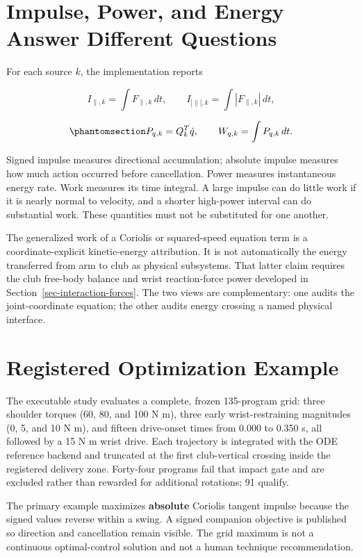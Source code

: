 \documentclass[
  letterpaper,
]{report}
\begin{document}
\section{Impulse, Power, and Energy Answer Different
Questions}\label{sec-source-metrics}

For each source \(k\), the implementation reports

\[
I_{\parallel,k}=\int F_{\parallel,k}\,dt,
\qquad
I_{|\parallel|,k}=\int |F_{\parallel,k}|\,dt,
\]

\begin{equation}\phantomsection\label{eq-source-integrals}{
P_{q,k}=Q_k^T\dot q,
\qquad
W_{q,k}=\int P_{q,k}\,dt.
}\end{equation}

Signed impulse measures directional accumulation; absolute impulse
measures how much action occurred before cancellation. Power measures
instantaneous energy rate. Work measures its time integral. A large
impulse can do little work if it is nearly normal to velocity, and a
shorter high-power interval can do substantial work. These quantities
must not be substituted for one another.

The generalized work of a Coriolis or squared-speed equation term is a
coordinate-explicit kinetic-energy attribution. It is not automatically
the energy transferred from arm to club as physical subsystems. That
latter claim requires the club free-body balance and wrist
reaction-force power developed in Section~\ref{sec-interaction-forces}.
The two views are complementary: one audits the joint-coordinate
equation; the other audits energy crossing a named physical interface.

\section{Registered Optimization Example}\label{sec-source-optimization}

The executable study evaluates a complete, frozen 135-program grid:
three shoulder torques (60, 80, and 100 N m), three early
wrist-restraining magnitudes (0, 5, and 10 N m), and fifteen drive-onset
times from 0.000 to 0.350 s, all followed by a 15 N m wrist drive. Each
trajectory is integrated with the ODE reference backend and truncated at
the first club-vertical crossing inside the registered delivery zone.
Forty-four programs fail that impact gate and are excluded rather than
rewarded for additional rotations; 91 qualify.

The primary example maximizes \textbf{absolute} Coriolis tangent impulse
because the signed values reverse within a swing. A signed companion
objective is published so direction and cancellation remain visible. The
grid maximum is not a continuous optimal-control solution and not a
human technique recommendation.
\end{document}
